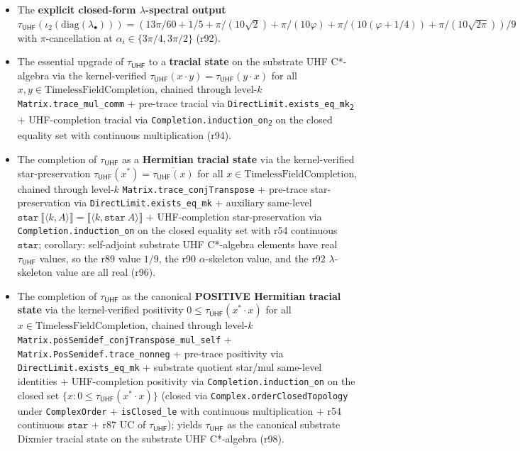 \documentclass[11pt,a4paper]{amsart}
\theoremstyle{plain}
\theoremstyle{definition}
\begin{document}
\begin{itemize}[itemsep=2pt,leftmargin=2em]
\item The \textbf{explicit closed-form $\lambda$-spectral output} $\tau_{\textsf{UHF}}(\iota_2(\mathrm{diag}(\lambda_\bullet))) = (13\pi/60 + 1/5 + \pi/(10\sqrt{2}) + \pi/(10\varphi) + \pi/(10(\varphi + 1/4)) + \pi/(10\sqrt{2\pi}))/9$ with $\pi$-cancellation at $\alpha_i \in \{3\pi/4, 3\pi/2\}$ (r92).
\item The essential upgrade of $\tau_{\textsf{UHF}}$ to a \textbf{tracial state} on the substrate UHF C*-algebra via the kernel-verified $\tau_{\textsf{UHF}}(x \cdot y) = \tau_{\textsf{UHF}}(y \cdot x)$ for all $x, y \in \mathrm{TimelessFieldCompletion}$, chained through level-$k$ \texttt{Matrix.trace\_mul\_comm} $+$ pre-trace tracial via \texttt{DirectLimit.exists\_eq\_mk\textsubscript{2}} $+$ UHF-completion tracial via \texttt{Completion.induction\_on\textsubscript{2}} on the closed equality set with continuous multiplication (r94).
\item The completion of $\tau_{\textsf{UHF}}$ as a \textbf{Hermitian tracial state} via the kernel-verified star-preservation $\tau_{\textsf{UHF}}(x^*) = \overline{\tau_{\textsf{UHF}}(x)}$ for all $x \in \mathrm{TimelessFieldCompletion}$, chained through level-$k$ \texttt{Matrix.trace\_conjTranspose} $+$ pre-trace star-preservation via \texttt{DirectLimit.exists\_eq\_mk} + auxiliary same-level $\mathtt{star}~\llbracket \langle k, A \rangle \rrbracket = \llbracket \langle k, \mathtt{star}~A \rangle \rrbracket$ + UHF-completion star-preservation via \texttt{Completion.induction\_on} on the closed equality set with r54 continuous $\mathtt{star}$; corollary: self-adjoint substrate UHF C*-algebra elements have real $\tau_{\textsf{UHF}}$ values, so the r89 value $1/9$, the r90 $\alpha$-skeleton value, and the r92 $\lambda$-skeleton value are all real (r96).
\item The completion of $\tau_{\textsf{UHF}}$ as the canonical \textbf{POSITIVE Hermitian tracial state} via the kernel-verified positivity $0 \le \tau_{\textsf{UHF}}(x^* \cdot x)$ for all $x \in \mathrm{TimelessFieldCompletion}$, chained through level-$k$ \texttt{Matrix.posSemidef\_conjTranspose\_mul\_self} $+$ \texttt{Matrix.PosSemidef.trace\_nonneg} $+$ pre-trace positivity via \texttt{DirectLimit.exists\_eq\_mk} + substrate quotient star/mul same-level identities + UHF-completion positivity via \texttt{Completion.induction\_on} on the closed set $\{x : 0 \le \tau_{\textsf{UHF}}(x^* \cdot x)\}$ (closed via \texttt{Complex.orderClosedTopology} under \texttt{ComplexOrder} + \texttt{isClosed\_le} with continuous multiplication + r54 continuous $\mathtt{star}$ + r87 UC of $\tau_{\textsf{UHF}}$); yields $\tau_{\textsf{UHF}}$ as the canonical substrate Dixmier tracial state on the substrate UHF C*-algebra (r98).

\end{itemize}
\end{document}
